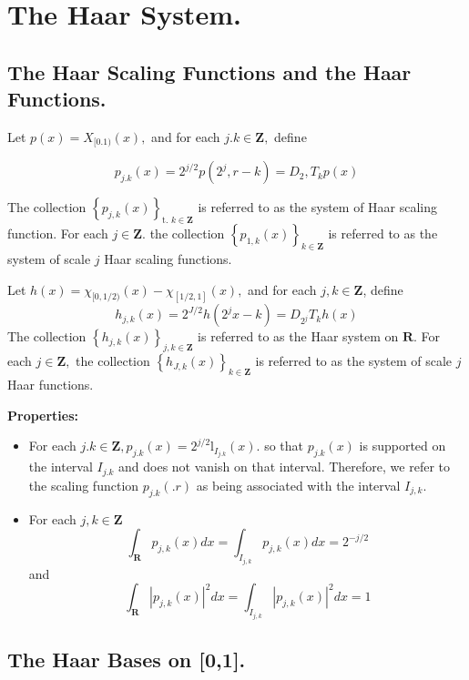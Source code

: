 \section{The Haar System.}

\subsection{The Haar Scaling Functions and the Haar Functions.}

\begin{definition}
Let $p(x)=X_{[0.1)}(x),$ and for each $j . k \in \mathbf{Z},$ define 

$$
p_{j . k}(x)=2^{j / 2} p\left(2^{j}, r-k\right)=D_{2}, T_{k} p(x)
$$

The collection $\left\{p_{j, k}(x)\right\}_{\text {t. } k \in \mathbf{Z}}$ is referred to as the system of Haar scaling function. For each $j \in \mathbf{Z}$. the collection $\left\{p_{1, k}(x)\right\}_{k \in \mathbf{Z}}$ is referred to as the system of
scale $j$ Haar scaling functions.

Let $h(x)=\chi_{[0,1 / 2)}(x)-\chi_{[1 / 2,1]}(x),$ and for each $j, k \in \mathbf{Z}$, define
$$
h_{j, k}(x)=2^{J / 2} h\left(2^{j} x-k\right)=D_{2^{j}} T_{k} h(x)
$$
The collection $\left\{h_{j, k}(x)\right\}_{j, k \in \mathbf{Z}}$ is referred to as the Haar system on $\mathbf{R}.$ For each $j \in \mathbf{Z},$ the collection $\left\{h_{J, k}(x)\right\}_{k \in \mathbf{Z}}$ is referred to as the system of scale $j$ Haar functions.
\end{definition} 


\textbf{Properties:}

\begin{itemize}
    \item For each $j . k \in \mathbf{Z}, p_{j . k}(x)=2^{j / 2} \mathrm{l}_{I_{j . k}}(x) .$ so that $p_{j . k}(x)$ is supported on the interval $I_{j . k}$ and does not vanish on that interval. Therefore, we refer to the scaling function $p_{j . k}(. r)$ as being associated with the interval $I_{j, k} .$
    
    \item For each $j, k \in \mathbf{Z}$
    $$
       \int_{\mathbf{R}} p_{j, k}(x) d x=\int_{I_{j, k}} p_{j, k}(x) d x=2^{-j / 2}
    $$
    and
    $$
       \int_{\mathbf{R}}\left|p_{j, k}(x)\right|^{2} d x=\int_{I_{j, k}}\left|p_{j, k}(x)\right|^{2} d x=1
    $$
\end{itemize}

\subsection{The Haar Bases on [0,1].}

